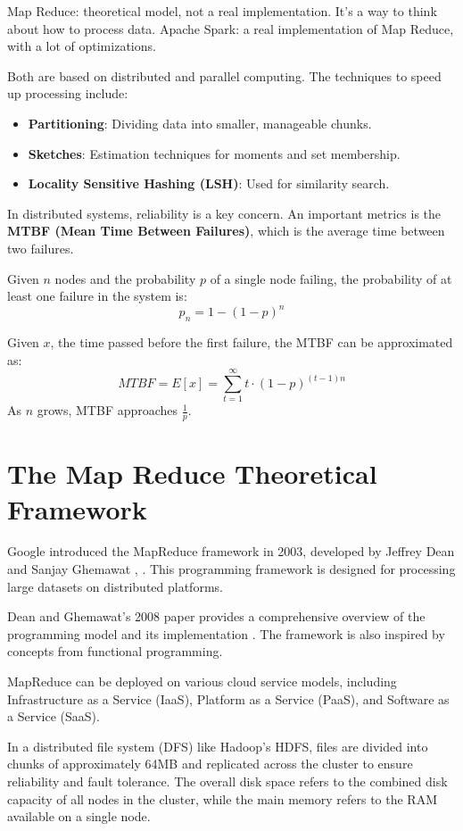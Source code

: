 \documentclass[a4paper]{tufte-handout} %
\begin{document}
Map Reduce: theoretical model, not a real implementation. It's a way to think about how to process data.
Apache Spark: a real implementation of Map Reduce, with a lot of optimizations.

Both are based on distributed and parallel computing. The techniques to speed up processing include:
\begin{itemize}
	\item \textbf{Partitioning}: Dividing data into smaller, manageable chunks.
	\item \textbf{Sketches}: Estimation techniques for moments and set membership.
	\item \textbf{Locality Sensitive Hashing (LSH)}: Used for similarity search.
\end{itemize}

In distributed systems, reliability is a key concern. An important metrics is the \textbf{MTBF (Mean Time Between Failures)}, which is the average time between two failures.

Given $n$ nodes and the probability $p$ of a single node failing, the probability of at least one failure in the system is:
\[ p_n = 1 - (1-p)^n \]

Given $x$, the time passed before the first failure, the MTBF can be approximated as:
\[ MTBF = E[x] = \sum_{t=1}^{\infty} t \cdot (1-p)^{(t-1)n} \]
As $n$ grows, MTBF approaches \( \frac{1}{p} \).

\section{The Map Reduce Theoretical Framework}
Google introduced the MapReduce framework in 2003, developed by Jeffrey Dean and Sanjay Ghemawat \cite{ghemawat2003google}, \cite{dean2004mapreduce}. This programming framework is designed for processing large datasets on distributed platforms.

Dean and Ghemawat's 2008 paper provides a comprehensive overview of the programming model and its implementation \cite{dean2008mapreduce}. The framework is also inspired by concepts from functional programming.

MapReduce can be deployed on various cloud service models, including Infrastructure as a Service (IaaS), Platform as a Service (PaaS), and Software as a Service (SaaS).

In a distributed file system (DFS) like Hadoop's HDFS, files are divided into chunks of approximately 64MB and replicated across the cluster to ensure reliability and fault tolerance. The overall disk space refers to the combined disk capacity of all nodes in the cluster, while the main memory refers to the RAM available on a single node.
\end{document}
